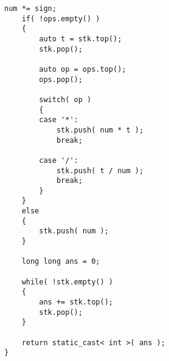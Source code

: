 \begin{lstlisting}[style=customc, caption={Two Stacks}]
    num *= sign;
    if( !ops.empty() )
    {
        auto t = stk.top();
        stk.pop();

        auto op = ops.top();
        ops.pop();

        switch( op )
        {
        case '*':
            stk.push( num * t );
            break;

        case '/':
            stk.push( t / num );
            break;
        }
    }
    else
    {
        stk.push( num );
    }

    long long ans = 0;

    while( !stk.empty() )
    {
        ans += stk.top();
        stk.pop();
    }

    return static_cast< int >( ans );
}
\end{lstlisting}